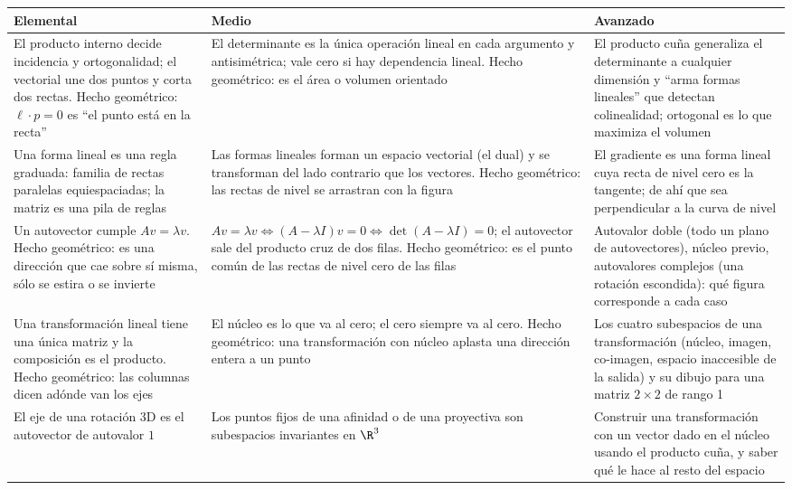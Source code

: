 {\small
\begin{tabularx}{\textwidth}{YYY}
\toprule
\textbf{Elemental} & \textbf{Medio} & \textbf{Avanzado}\\
\midrule
El producto interno decide incidencia y ortogonalidad; el vectorial une dos puntos y corta
dos rectas. Hecho geométrico: \(\ell\cdot p=0\) es ``el punto está en la recta'' &
El determinante es la única operación lineal en cada argumento y antisimétrica; vale cero
si hay dependencia lineal. Hecho geométrico: es el área o volumen orientado &
El producto cuña generaliza el determinante a cualquier dimensión y ``arma formas
lineales'' que detectan colinealidad; ortogonal es lo que maximiza el volumen\\
\addlinespace
Una forma lineal es una regla graduada: familia de rectas paralelas equiespaciadas; la
matriz es una pila de reglas &
Las formas lineales forman un espacio vectorial (el dual) y se transforman del lado
contrario que los vectores. Hecho geométrico: las rectas de nivel se arrastran con la figura &
El gradiente es una forma lineal cuya recta de nivel cero es la tangente; de ahí que sea
perpendicular a la curva de nivel\\
\addlinespace
Un autovector cumple \(Av=\lambda v\). Hecho geométrico: es una dirección que cae sobre sí
misma, sólo se estira o se invierte &
\(Av=\lambda v\Leftrightarrow(A-\lambda I)v=0\Leftrightarrow\det(A-\lambda I)=0\); el
autovector sale del producto cruz de dos filas. Hecho geométrico: es el punto común de las
rectas de nivel cero de las filas &
Autovalor doble (todo un plano de autovectores), núcleo previo, autovalores complejos (una
rotación escondida): qué figura corresponde a cada caso\\
\addlinespace
Una transformación lineal tiene una única matriz y la composición es el producto. Hecho
geométrico: las columnas dicen adónde van los ejes &
El núcleo es lo que va al cero; el cero siempre va al cero. Hecho geométrico: una
transformación con núcleo aplasta una dirección entera a un punto &
Los cuatro subespacios de una transformación (núcleo, imagen, co-imagen, espacio
inaccesible de la salida) y su dibujo para una matriz \(2\times2\) de rango 1\\
\addlinespace
El eje de una rotación 3D es el autovector de autovalor \(1\) &
Los puntos fijos de una afinidad o de una proyectiva son subespacios invariantes en
\(\R^3\) &
Construir una transformación con un vector dado en el núcleo usando el producto cuña, y
saber qué le hace al resto del espacio\\
\bottomrule
\end{tabularx}
}

